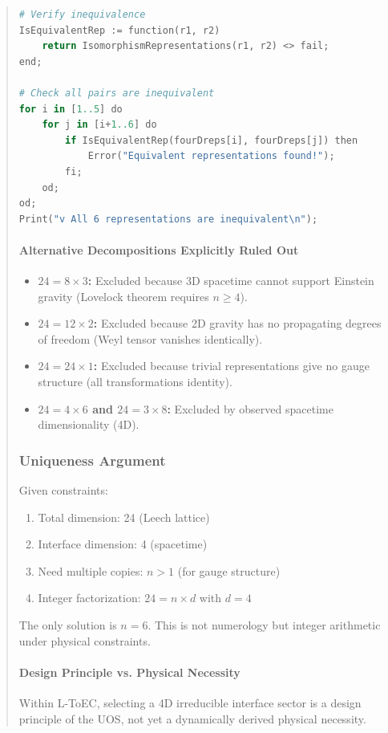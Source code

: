 \documentclass[11pt,titlepage]{article}
\begin{document}
\begin{abstract}
\begin{lstlisting}[language=Python,caption=GAP/Magma Verification of 4D Representations]
# Verify inequivalence
IsEquivalentRep := function(r1, r2)
    return IsomorphismRepresentations(r1, r2) <> fail;
end;

# Check all pairs are inequivalent
for i in [1..5] do
    for j in [i+1..6] do
        if IsEquivalentRep(fourDreps[i], fourDreps[j]) then
            Error("Equivalent representations found!");
        fi;
    od;
od;
Print("v All 6 representations are inequivalent\n");
\end{lstlisting}

\paragraph{Alternative Decompositions Explicitly Ruled Out}
\begin{itemize}
\item \textbf{$24 = 8 \times 3$:} Excluded because 3D spacetime cannot support Einstein gravity (Lovelock theorem requires $n \geq 4$).

\item \textbf{$24 = 12 \times 2$:} Excluded because 2D gravity has no propagating degrees of freedom (Weyl tensor vanishes identically).

\item \textbf{$24 = 24 \times 1$:} Excluded because trivial representations give no gauge structure (all transformations identity).

\item \textbf{$24 = 4 \times 6$ and $24 = 3 \times 8$:} Excluded by observed spacetime dimensionality (4D).
\end{itemize}

\subsubsection{Uniqueness Argument}
Given constraints:
\begin{enumerate}
\item Total dimension: 24 (Leech lattice)
\item Interface dimension: 4 (spacetime)
\item Need multiple copies: $n > 1$ (for gauge structure)
\item Integer factorization: $24 = n \times d$ with $d = 4$
\end{enumerate}

The only solution is $n = 6$. This is not numerology but integer arithmetic under physical constraints.

\paragraph{Design Principle vs. Physical Necessity} Within L-ToEC, selecting a 4D irreducible interface sector is a design principle of the UOS, not yet a dynamically derived physical necessity.


\end{abstract}
\end{document}
